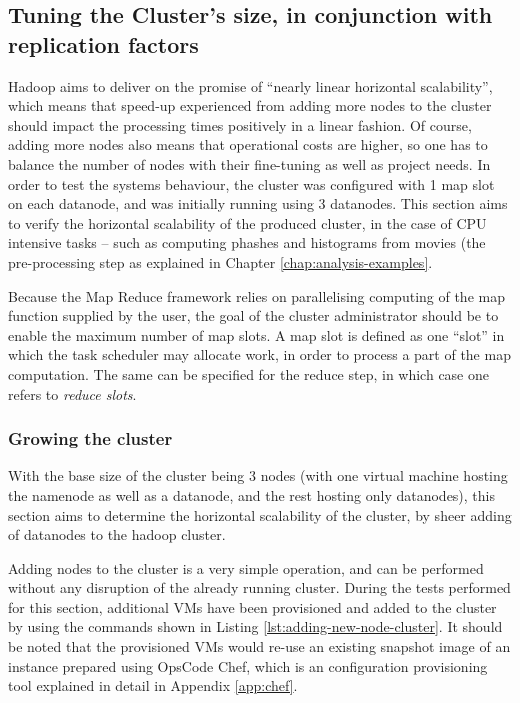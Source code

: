 \subsection{Tuning the Cluster's size, in conjunction with replication factors}
\label{sec:tuning-number-of-nodes}
Hadoop aims to deliver on the promise of ``nearly linear horizontal scalability'', which means that speed-up experienced from adding more nodes to the cluster should impact the processing times positively in a linear fashion. Of course, adding more nodes also means that operational costs are higher, so one has to balance the number of nodes with their fine-tuning as well as project needs. In order to test the systems behaviour, the cluster was configured with 1 map slot on each datanode, and was initially running using 3 datanodes. This section aims to verify the horizontal scalability of the produced cluster, in the case of CPU intensive tasks -- such as computing phashes and histograms from movies (the pre-processing step as explained in Chapter \ref{chap:analysis-examples}.

Because the Map Reduce framework relies on parallelising computing of the map function supplied by the user, the goal of the cluster administrator should be to enable the maximum number of map slots. A map slot is defined as one ``slot'' in which the task scheduler may allocate work, in order to process a part of the map computation. The same can be specified for the reduce step, in which case one refers to \textit{reduce slots}.

\subsubsection{Growing the cluster}
\label{sec:growing-the-cluster}
With the base size of the cluster being 3 nodes (with one virtual machine hosting the namenode as well as a datanode, and the rest hosting only datanodes), this section aims to determine the horizontal scalability of the cluster, by sheer adding of datanodes to the hadoop cluster.

Adding nodes to the cluster is a very simple operation, and can be performed without any disruption of the already running cluster. During the tests performed for this section, additional VMs have been provisioned and added to the cluster by using the commands shown in Listing \ref{lst:adding-new-node-cluster}. It should be noted that the provisioned VMs would re-use an existing snapshot image of an instance prepared using OpsCode Chef, which is an configuration provisioning tool explained in detail in Appendix \ref{app:chef}. 

